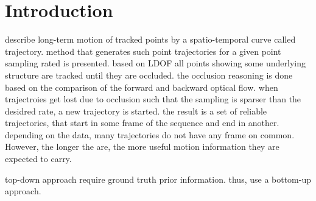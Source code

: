 



% 
%

\chapter{Introduction}

describe long-term motion of tracked points by a spatio-temporal curve called trajectory.
method that generates such point trajectories for a given point sampling rated is presented. 
based on LDOF all points showing some underlying structure are tracked until they are occluded. the occlusion reasoning is done based on the comparison of the forward and backward optical flow. when trajectroies get lost due to occlusion such that the sampling is sparser than the desidred rate, a new trajectory is started. the result is a set of reliable trajectories, that start in some frame of the sequence and end in another. depending on the data, many trajectories do not have any frame on common. However, the longer the are, the more useful motion information they are expected to carry. 

top-down approach require ground truth prior information.
thus, use a bottom-up approach.

